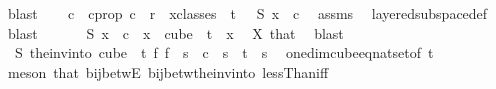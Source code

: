 \begin{isabellebody}
\ blast\isanewline
\isanewline
\ \ \isamarkupfalse%
\ c{}\ \ c{}{\isacharunderscore}{\kern0pt}prop{\isacharcolon}{\kern0pt}\ {\isachardoublequoteopen}c{}\ {\isacharless}{\kern0pt}\ r\ {\isasymand}\ {\isacharparenleft}{\kern0pt}{\isasymforall}x{\isasymin}classes\ {}\ t\ {}{\isachardot}{\kern0pt}\ {\isasymchi}\ {\isacharparenleft}{\kern0pt}S\ x{\isacharparenright}{\kern0pt}\ {\isacharequal}{\kern0pt}\ c{}{\isacharparenright}{\kern0pt}{\isachardoublequoteclose}\ \isamarkupfalse%
\ assms{\isacharparenleft}{\kern0pt}{}{\isacharparenright}{\kern0pt}\ \isamarkupfalse%
\ layered{\isacharunderscore}{\kern0pt}subspace{\isacharunderscore}{\kern0pt}def\ \isamarkupfalse%
\ blast\isanewline
\ \ \isamarkupfalse%
\ \isamarkupfalse%
\ {\isachardoublequoteopen}{\isacharparenleft}{\kern0pt}{\isasymchi}\ {\isacharparenleft}{\kern0pt}S\ x{\isacharparenright}{\kern0pt}\ {\isacharequal}{\kern0pt}\ c{}{\isacharparenright}{\kern0pt}{\isachardoublequoteclose}\ \ {\isachardoublequoteopen}x\ {\isasymin}\ cube\ {}\ t{\isachardoublequoteclose}\ \ x\ \isamarkupfalse%
\ X\ that\ \isamarkupfalse%
\ blast\isanewline
\ \ \isamarkupfalse%
\ \isamarkupfalse%
\ {\isachardoublequoteopen}{\isasymchi}\ {\isacharparenleft}{\kern0pt}S\ {\isacharparenleft}{\kern0pt}the{\isacharunderscore}{\kern0pt}inv{\isacharunderscore}{\kern0pt}into\ {\isacharparenleft}{\kern0pt}cube\ {}\ t{\isacharparenright}{\kern0pt}\ {\isacharparenleft}{\kern0pt}{\isasymlambda}f{\isachardot}{\kern0pt}\ f\ {}{\isacharparenright}{\kern0pt}\ s{\isacharparenright}{\kern0pt}{\isacharparenright}{\kern0pt}\ {\isacharequal}{\kern0pt}\ c{}{\isachardoublequoteclose}\ \ {\isachardoublequoteopen}s\ {\isacharless}{\kern0pt}\ t{\isachardoublequoteclose}\ \ s\ \isamarkupfalse%
\ one{\isacharunderscore}{\kern0pt}dim{\isacharunderscore}{\kern0pt}cube{\isacharunderscore}{\kern0pt}eq{\isacharunderscore}{\kern0pt}nat{\isacharunderscore}{\kern0pt}set{\isacharbrackleft}{\kern0pt}of\ t{\isacharbrackright}{\kern0pt}\ \isanewline
\ \ \ \ \isamarkupfalse%
\ {\isacharparenleft}{\kern0pt}meson\ that\ bij{\isacharunderscore}{\kern0pt}betwE\ bij{\isacharunderscore}{\kern0pt}betw{\isacharunderscore}{\kern0pt}the{\isacharunderscore}{\kern0pt}inv{\isacharunderscore}{\kern0pt}into\ lessThan{\isacharunderscore}{\kern0pt}iff{\isacharparenright}{\kern0pt}\isanewline

\end{isabellebody}
